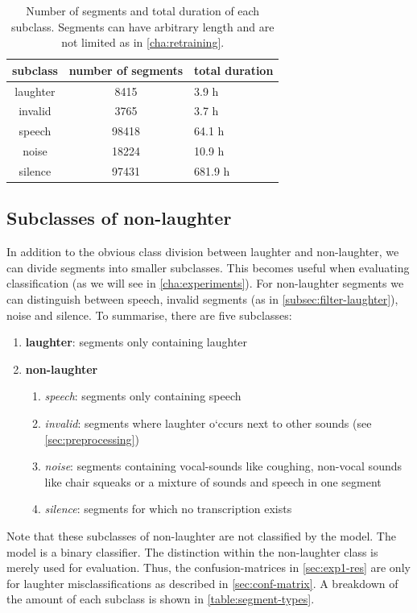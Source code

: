 \documentclass[bsc,frontabs,parskip,deptreport]{infthesis}
\begin{document}
\begin{table}[h!]
\begin{tabular}{c|c|l}
     subclass & number of segments & total duration \\
     \hline
     laughter & 8415 & 3.9 h \\ 
     invalid & 3765 & 3.7 h \\
     speech & 98418 & 64.1 h \\
     noise & 18224 & 10.9 h \\
     silence & 97431 & 681.9 h 
\end{tabular}
\centering
\caption{Number of segments and total duration of each subclass. Segments can have arbitrary length and are not limited as in \autoref{cha:retraining}.}
\label{table:segment-types}
\end{table}

\subsection{Subclasses of non-laughter}
In addition to the obvious class division between laughter and non-laughter, we can divide segments into smaller subclasses. This becomes useful when evaluating classification (as we will see in \autoref{cha:experiments}).
For non-laughter segments we can distinguish between speech, invalid segments (as in \autoref{subsec:filter-laughter}), noise and silence.
To summarise, there are five subclasses:
\begin{enumerate}
    \item \textbf{laughter}: segments only containing laughter
    \item \textbf{non-laughter}
    \begin{enumerate}
        \item \textit{speech}: segments only containing speech
        \item \textit{invalid}: segments where laughter o`ccurs next to other sounds (see \autoref{sec:preprocessing})
        \item \textit{noise}: segments containing vocal-sounds like coughing, non-vocal sounds like chair squeaks or a mixture of sounds and speech in one segment
        \item \textit{silence}: segments for which no transcription exists
    \end{enumerate}
\end{enumerate}
Note that these subclasses of non-laughter are not classified by the model. The model is a binary classifier. The distinction within the non-laughter class is merely used for evaluation.
Thus, the confusion-matrices in \autoref{sec:exp1-res} are only for laughter misclassifications as described in \autoref{sec:conf-matrix}.
A breakdown of the amount of each subclass is shown in \autoref{table:segment-types}.
\end{document}
